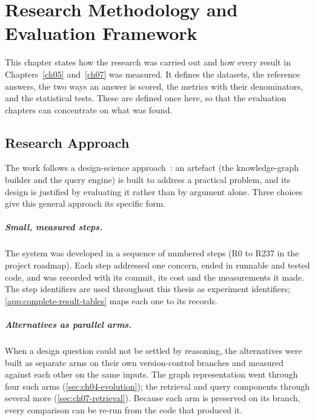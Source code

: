 \chapter{Research Methodology and Evaluation Framework}\label{ch03}

This chapter states how the research was carried out and how every result in Chapters~\ref{ch05}
and~\ref{ch07} was measured. It defines the datasets, the reference answers, the two ways an answer is
scored, the metrics with their denominators, and the statistical tests. These are defined once here, so
that the evaluation chapters can concentrate on what was found.

\section{Research Approach}\label{sec:ch03-research-approach}

The work follows a design-science approach~\cite{hevner2004design}: an artefact (the knowledge-graph
builder and the query engine) is built to address a practical problem, and its design is justified by
evaluating it rather than by argument alone. Three choices give this general approach its specific form.

\paragraph{Small, measured steps.} The system was developed in a sequence of numbered steps (R0 to R237 in
the project roadmap). Each step addressed one concern, ended in runnable and tested code, and was recorded
with its commit, its cost and the measurements it made. The step identifiers are used throughout this thesis
as experiment identifiers; \cref{app:complete-result-tables} maps each one to its records.

\paragraph{Alternatives as parallel arms.} When a design question could not be settled by reasoning, the
alternatives were built as separate arms on their own version-control branches and measured against each
other on the same inputs. The graph representation went through four such arms (\cref{sec:ch04-evolution});
the retrieval and query components through several more (\cref{sec:ch07-retrieval}).
Because each arm is preserved on its branch, every comparison can be re-run from the code that produced it.

